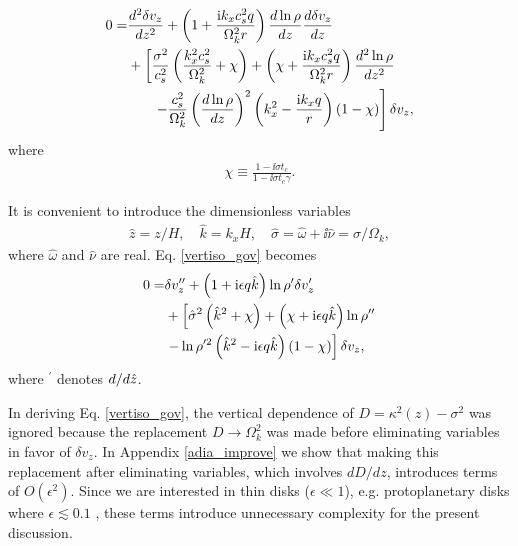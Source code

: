 \begin{align}
  0 =& \frac{d^2\delta v_z}{dz^2} + \left(1 + \frac{\mathrm{i} k_x c_s^2
      q}{\Omega_k^2r}\right)\frac{d\ln\rho}{dz}\frac{d\delta
    v_z}{dz} \notag\\
  &+ \left[\frac{\sigma^2}{c_s^2}\left(\frac{k_x^2c_s^2}{\Omega_k^2} +
      \chi\right) + \left(\chi + \frac{\mathrm{i} k_x c_s^2
        q}{\Omega_k^2r}\right)\frac{d^2\ln\rho}{dz^2}\right. \notag\\
  &\phantom{+=}\left.-
    \frac{c_s^2}{\Omega_k^2}\left(\frac{d\ln\rho}{dz}\right)^2\left(k_x^2 -
      \frac{\mathrm{i} k_x q}{r}\right)
    \left(1-\chi\right) 
  \right]\delta v_z,\label{vertiso_gov}
\end{align}
where
\begin{align}
  \chi \equiv \frac{1-\ii\sigma t_c}{1-\ii\sigma t_c\gamma}.
\end{align}





It is convenient to introduce the dimensionless variables
\begin{align}
  \hat{z} = z/H,\quad \hat{k}=k_xH, \quad \hat{\sigma} =\hat{\omega} +
  \ii\hat{\nu}= \sigma/\Omega_k,
\end{align}
where $\hat{\omega}$ and $\hat{\nu}$ are real. 
Eq. \ref{vertiso_gov} becomes 
\begin{align}
  0=& \delta v_z ^{\prime\prime} + \left(1 + \mathrm{i}\epsilon
    q\hat{k}\right)\ln\rho^{\prime}\delta v_z^\prime \notag\\
  &+
  \left[\hat{\sigma}^2\left(\hat{k}^2+\chi\right) +
    \left(  \chi + \mathrm{i} \epsilon q\hat{k}\right)\ln\rho^{\prime\prime}\right.
  \notag\\
  &\left.- \ln\rho^{\prime
      2}\left(\hat{k}^2 -
      \mathrm{i}\epsilon
      q\hat{k}\right)\left(1 - \chi\right)\right]\delta v_z,\label{vertiso_gov_nondim}
\end{align}
where $^\prime$ denotes $d/d\hat{z}$.

In deriving Eq. \ref{vertiso_gov}, the vertical dependence of
$D=\kappa^2(z)-\sigma^2$ was ignored because the replacement
$D\to\Omega_k^2$ was made before eliminating variables in favor of
$\delta v_z$. In Appendix \ref{adia_improve} we show that making this
replacement after eliminating variables, which involves $dD/dz$,
introduces terms of $O(\epsilon^2)$. Since we are interested in 
thin disks ($\epsilon\ll 1 $), e.g. protoplanetary disks where 
$\epsilon\lesssim 0.1$ \citep{chiang10}, these terms introduce
unnecessary complexity for the present discussion. 
      
